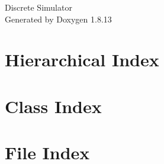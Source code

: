 \documentclass[twoside]{book}
\newcommand{\+}{\discretionary{\mbox{\scriptsize$\hookleftarrow$}}{}{}}
\newcommand{\clearemptydoublepage}{%
  \newpage{\pagestyle{empty}\cleardoublepage}%
}
\begin{document}
\hypersetup{pageanchor=false,
             bookmarksnumbered=true,
             pdfencoding=unicode
            }
\begin{titlepage}
\vspace*{7cm}
\begin{center}%
{\Large Discrete Simulator }\\
\vspace*{1cm}
{\large Generated by Doxygen 1.8.13}\\
\end{center}
\end{titlepage}
\clearemptydoublepage
{}
\tableofcontents
\clearemptydoublepage
{}
\hypersetup{pageanchor=true}

\chapter{Hierarchical Index}

\chapter{Class Index}

\chapter{File Index}

\end{document}
